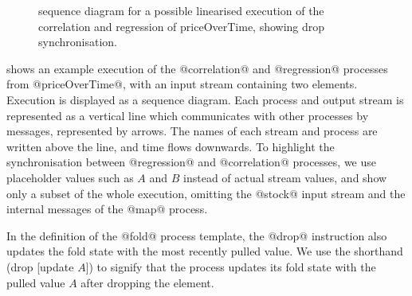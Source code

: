 \begin{figure}
\center
\begin{sequencediagram}









\end{sequencediagram}
\caption{sequence diagram for a possible linearised execution of the correlation and regression of priceOverTime, showing drop synchronisation. }
\label{figs/swim/drop/priceOverTime}
\end{figure}

 shows an example execution of the @correlation@ and @regression@ processes from @priceOverTime@, with an input stream containing two elements.
Execution is displayed as a sequence diagram.
Each process and output stream is represented as a vertical line which communicates with other processes by messages, represented by arrows.
The names of each stream and process are written above the line, and time flows downwards.
To highlight the synchronisation between @regression@ and @correlation@ processes, we use placeholder values such as $A$ and $B$ instead of actual stream values, and show only a subset of the whole execution, omitting the @stock@ input stream and the internal messages of the @map@ process.

In the definition of the @fold@ process template, the @drop@ instruction also updates the fold state with the most recently pulled value.
We use the shorthand (drop [update $A$]) to signify that the process updates its fold state with the pulled value $A$ after dropping the element.

